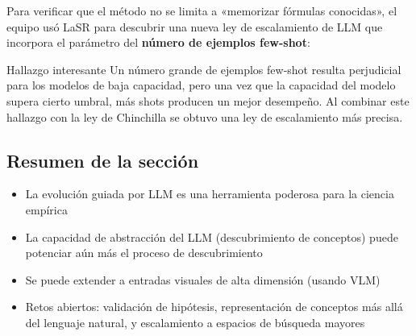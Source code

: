 Para verificar que el método no se limita a «memorizar fórmulas conocidas», el equipo usó LaSR para descubrir una nueva ley de escalamiento de LLM que incorpora el parámetro del \textbf{número de ejemplos few-shot}:

\begin{warningbox}{Hallazgo interesante}
Un número grande de ejemplos few-shot resulta perjudicial para los modelos de baja capacidad, pero una vez que la capacidad del modelo supera cierto umbral, más shots producen un mejor desempeño. Al combinar este hallazgo con la ley de Chinchilla se obtuvo una ley de escalamiento más precisa.
\end{warningbox}

\subsection{Resumen de la sección}

\begin{itemize}
    \item La evolución guiada por LLM es una herramienta poderosa para la ciencia empírica
    \item La capacidad de abstracción del LLM (descubrimiento de conceptos) puede potenciar aún más el proceso de descubrimiento
    \item Se puede extender a entradas visuales de alta dimensión (usando VLM)
    \item Retos abiertos: validación de hipótesis, representación de conceptos más allá del lenguaje natural, y escalamiento a espacios de búsqueda mayores
\end{itemize}
